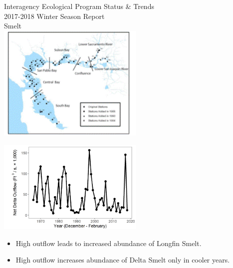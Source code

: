 \documentclass[]{article}\usepackage[]{graphicx}\usepackage[]{color}
\begin{document}
\newpage


\begin{Row}
  \begin{Cell}{7}
    \vspace{0.2cm}
    \begin{center}
      \doublespacing
      {\Large Interagency Ecological Program Status \& Trends } \\
      \vspace{0.2cm}
      {\Large 2017-2018 Winter Season Report} \\
      \vspace{0.5cm}
      {\Huge Smelt} \\
      \vspace{0.3cm}
      \includegraphics[width=7cm,align=m]{figures/smelt/map.png}
    \end{center}
  \end{Cell}
  \begin{Cell}{6}
    \vspace{0.2cm}
    \begin{center}
      \includegraphics[width=7cm,trim=0 0 0 0,clip,align=m]{figures/outflow_tmp.png}
      \begin{itemize}[leftmargin=*]
        \item High outflow leads to increased abundance of Longfin Smelt.
        \item High outflow increases abundance of Delta Smelt only in cooler years.
      \end{itemize}
    \end{center}
  \end{Cell}
\end{Row}
\end{document}
